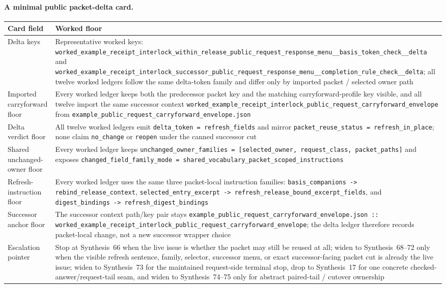 \documentclass[11pt]{article}
\begin{document}
\paragraph{A minimal public packet-delta card.}
\begin{table}[t]
\centering
\footnotesize
\begin{tabularx}{\linewidth}{@{}l X@{}}
\toprule
Card field & Worked floor \\
\midrule
Delta keys & Representative worked keys: \nolinkurl{worked_example_receipt_interlock_within_release_public_request_response_menu__basis_token_check__delta} and \nolinkurl{worked_example_receipt_interlock_successor_public_request_response_menu__completion_rule_check__delta}; all twelve worked ledgers follow the same delta-token family and differ only by imported packet / selected owner path \\
Imported carryforward floor & Every worked ledger keeps both the predecessor packet key and the matching carryforward-profile key visible, and all twelve import the same successor context \nolinkurl{worked_example_receipt_interlock_public_request_carryforward_envelope} from \nolinkurl{example_public_request_carryforward_envelope.json} \\
Delta verdict floor & All twelve worked ledgers emit \nolinkurl{delta_token = refresh_fields} and mirror \nolinkurl{packet_reuse_status = refresh_in_place}; none claim \nolinkurl{no_change} or \nolinkurl{reopen} under the canned successor cut \\
Shared unchanged-owner floor & Every worked ledger keeps \nolinkurl{unchanged_owner_families = [selected_owner, request_class, packet_paths]} and exposes \nolinkurl{changed_field_family_mode = shared_vocabulary_packet_scoped_instructions} \\
Refresh-instruction floor & Every worked ledger uses the same three packet-local instruction families: \nolinkurl{basis_companions -> rebind_release_context}, \nolinkurl{selected_entry_excerpt -> refresh_release_bound_excerpt_fields}, and \nolinkurl{digest_bindings -> refresh_digest_bindings} \\
Successor anchor floor & The successor context path/key pair stays \nolinkurl{example_public_request_carryforward_envelope.json :: worked_example_receipt_interlock_public_request_carryforward_envelope}; the delta ledger therefore records packet-local change, not a new successor wrapper choice \\
Escalation pointer & Stop at Synthesis~66 when the live issue is whether the packet may still be reused at all; widen to Synthesis~68--72 only when the visible refresh sentence, family, selector, successor menu, or exact successor-facing packet cut is already the live issue; widen to Synthesis~73 for the maintained request-side terminal stop, drop to Synthesis~17 for one concrete checked-answer/request-tail seam, and widen to Synthesis~74--75 only for abstract paired-tail / cutover ownership \\

\end{tabularx}
\end{table}
\end{document}
